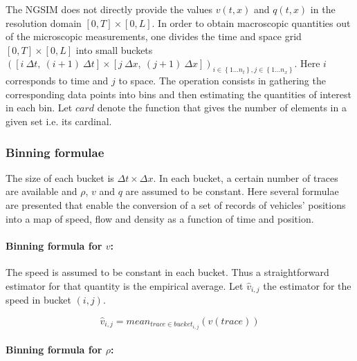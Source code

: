\documentclass[preprint]{elsarticle}
\begin{document}
The NGSIM does not directly provide the values $v\left(t,x\right)$
and $q\left(t,x\right)$ in the resolution domain $\left[0,T\right]\times\left[0,L\right]$.
In order to obtain macroscopic quantities out of the microscopic measurements,
one divides the time and space grid $\left[0,T\right]\times\left[0,L\right]$
into small buckets $\left(\left[i\:\Delta t,\:\left(i+1\right)\:\Delta t\right]\times\left[j\:\Delta x,\:\left(j+1\right)\:\Delta x\right]\right)_{i\in\left\{ 1\ldots n_{t}\right\} ,j\in\left\{ 1\ldots n_{x}\right\} }$.
Here $i$ corresponds to time and $j$ to space. The operation consists
in gathering the corresponding data points into bins and then estimating
the quantities of interest in each bin. Let $card$ denote the function
that gives the number of elements in a given set i.e. its cardinal.


\subsubsection{Binning formulae}

The size of each bucket is $\Delta t\times\Delta x$. In each bucket,
a certain number of traces are available and $\rho$, $v$ and $q$
are assumed to be constant. Here several formulae are presented that
enable the conversion of a set of records of vehicles' positions into
a map of speed, flow and density as a function of time and position.


\paragraph{Binning formula for $v$:}

The speed is assumed to be constant in each bucket. Thus a straightforward
estimator for that quantity is the empirical average. Let $\widehat{v}_{i,j}$
the estimator for the speed in bucket $\left(i,j\right)$.

\[
\widehat{v}_{i,j}=mean_{trace\in bucket_{i,j}}\left(v\left(trace\right)\right)
\]



\paragraph{Binning formula for $\rho$:}
\end{document}
